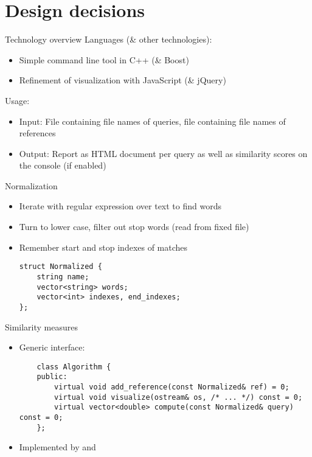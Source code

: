 \documentclass[simple]{mybeamer}
\begin{document}
\section{Design decisions}

\begin{frame}{Technology overview}
  Languages (\& other technologies):
  \begin{itemize}
    \item Simple command line tool in C++ (\& Boost)
    \item Refinement of visualization with JavaScript (\& jQuery)
  \end{itemize}
  
  Usage:
  \begin{itemize}
    \item Input: File containing file names of queries, file containing file names
    of references
    \item Output: Report as HTML document per query as well as similarity scores on the console (if enabled)
  \end{itemize}
\end{frame}

\begin{frame}[fragile]{Normalization}
  \begin{itemize}
    \item Iterate with regular expression  over text
    to find words
    \item Turn to lower case, filter out stop words (read from fixed file)
    \item Remember start and stop indexes of matches
    
\begin{lstlisting}
struct Normalized {
    string name;
    vector<string> words;
    vector<int> indexes, end_indexes;
};
\end{lstlisting}
  \end{itemize}
\end{frame}


\begin{frame}[fragile]{Similarity measures}
    \begin{itemize}
      \item Generic interface:
    \begin{lstlisting}
    class Algorithm {
    public:
        virtual void add_reference(const Normalized& ref) = 0; 
        virtual void visualize(ostream& os, /* ... */) const = 0;
        virtual vector<double> compute(const Normalized& query) const = 0;
    };
    \end{lstlisting}
      \item Implemented by  and 
    \end{itemize}
\end{frame}
\end{document}
